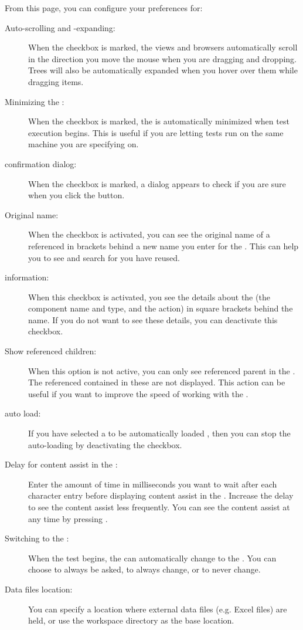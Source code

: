 From this page, you can configure your preferences for:
\begin{description}
\item [Auto-scrolling and -expanding:]{When the checkbox is marked, the views and browsers  automatically scroll in the direction you move the mouse when you are dragging and dropping. Trees will also be automatically expanded when you hover over them while dragging items.}
\item [Minimizing the \ite{}:]{When the checkbox is marked, the \ite{} is automatically minimized when test execution begins. This is useful if you are letting tests run on the same machine you are specifying on.}
\item [\gdaut{} confirmation dialog:]{When the checkbox is marked, a dialog appears to check if you are sure when you click the   button.}
\item [Original \gdcase{} name:]{When the checkbox is activated, you can see the original name of a referenced \gdcase{} in brackets behind a new name you enter for the \gdcase{}. This can help you to see and search for \gdcases{} you have reused. }
\item[\gdstep{} information:]{When this checkbox is activated, you see the details about the \gdstep{} (the component name and type, and the action) in square brackets behind the \gdstep{} name. If you do not want to see these details, you can deactivate this checkbox.}
\item[Show referenced children:]{When this option is not active, you can only see  referenced parent \gdcases{} in the \gdtestcasebrowser{}. The referenced \gdcases{} contained in these \gdcases{} are not displayed. This action can be useful if you want to improve the speed of working with the \ite{}.}
\item [\gdproject{} auto load:]{If you have selected a \gdproject{} to be automatically loaded , then you can stop the auto-loading by deactivating the checkbox.}
\item [Delay for content assist in the \gdcompnamesview{}:]{Enter the amount of time in milliseconds you want to wait after each character entry before displaying content assist in the \gdcompnamesview{}. Increase the delay to see the content assist less frequently. You can see the content assist at any time by pressing .}
\item [Switching to the \execpersp{}:]{When the test begins, the \ite{} can automatically change to the \execpersp{}. You can choose to always be asked, to always change, or to never change. }
\item [Data files location:]{You can specify a location where external data files (e.g. Excel files) are held, or use the workspace directory as the base location. }
\end{description}

 

